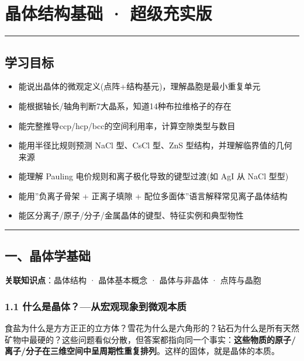 \section{晶体结构基础 · 超级充实版}\label{ux6676ux4f53ux7ed3ux6784ux57faux7840-ux8d85ux7ea7ux5145ux5b9eux7248}

\begin{center}\rule{0.5\linewidth}{0.5pt}\end{center}

\subsection{学习目标}\label{ux5b66ux4e60ux76eeux6807}

\begin{itemize}
\tightlist
\item
  能说出晶体的微观定义(点阵+结构基元)，理解晶胞是最小重复单元
\item
  能根据轴长/轴角判断7大晶系，知道14种布拉维格子的存在
\item
  能完整推导ccp/hcp/bcc的空间利用率，计算空隙类型与数目
\item
  能用半径比规则预测 NaCl 型、CsCl 型、ZnS 型结构，并理解临界值的几何来源
\item
  能理解 Pauling 电价规则和离子极化导致的键型过渡(如 AgI 从 NaCl 型 型)
\item
  能用''负离子骨架 + 正离子填隙 + 配位多面体''语言解释常见离子晶体结构
\item
  能区分离子/原子/分子/金属晶体的键型、特征实例和典型物性
\end{itemize}

\begin{center}\rule{0.5\linewidth}{0.5pt}\end{center}

\subsection{一、晶体学基础}\label{ux4e00ux6676ux4f53ux5b66ux57faux7840}

\textbf{关联知识点}：晶体结构 · 晶体基本概念 · 晶体与非晶体 · 点阵与晶胞

\subsubsection{1.1 什么是晶体？---从宏观现象到微观本质}\label{ux4ec0ux4e48ux662fux6676ux4f53ux4eceux5b8fux89c2ux73b0ux8c61ux5230ux5faeux89c2ux672cux8d28}

食盐为什么是方方正正的立方体？雪花为什么是六角形的？钻石为什么是所有天然矿物中最硬的？这些问题看似分散，但答案都指向同一个事实：\textbf{这些物质的原子/离子/分子在三维空间中呈周期性重复排列}。这样的固体，就是晶体的本质。


